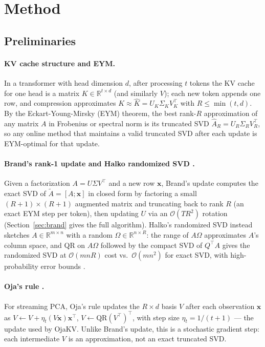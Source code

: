 \documentclass{article}
\newcommand{\R}{\mathbb{R}}
\begin{document}
\section{Method}
\label{sec:method}

\subsection{Preliminaries}
\label{sec:background}

\paragraph{KV cache structure and EYM.}
In a transformer with head dimension $d$, after processing $t$ tokens the KV
cache for one head is a matrix $K \in \R^{t \times d}$ (and similarly $V$);
each new token appends one row, and compression approximates
$K \approx \hat{K} = U_K \Sigma_K V_K^\top$ with $R \leq \min(t, d)$.  By the
Eckart-Young-Mirsky (EYM) theorem, the best rank-$R$ approximation of any
matrix $A$ in Frobenius or spectral norm is its truncated SVD
$\hat{A}_R = U_R \Sigma_R V_R^\top$, so any online method that maintains a
valid truncated SVD after each update is EYM-optimal for that update.

\paragraph{Brand's rank-1 update \citep{brand2006} and Halko randomized SVD \citep{halko2011}.}
Given a factorization $A = U \Sigma V^\top$ and a new row $\mathbf{x}$,
Brand's update computes the exact SVD of $\tilde{A} = [A; \mathbf{x}]$ in
closed form by factoring a small $(R+1) \times (R+1)$ augmented matrix and
truncating back to rank $R$ (an exact EYM step per token), then updating
$U$ via an $\mathcal{O}(TR^2)$ rotation (Section~\ref{sec:brand} gives the
full algorithm).  Halko's randomized SVD instead sketches $A \in
\R^{m \times n}$ with a random $\Omega \in \R^{n \times R}$: the range of
$A\Omega$ approximates $A$'s column space, and QR on $A\Omega$ followed by
the compact SVD of $Q^\top A$ gives the randomized SVD at
$\mathcal{O}(mnR)$ cost vs.\ $\mathcal{O}(mn^2)$ for exact SVD, with
high-probability error bounds \citep{halko2011}.

\paragraph{Oja's rule \citep{oja1982}.}
For streaming PCA, Oja's rule updates the $R \times d$ basis $V$ after each
observation $\mathbf{x}$ as $V \leftarrow V + \eta_t (V\mathbf{x})\mathbf{x}^\top$,
$V \leftarrow \mathrm{QR}(V^\top)^\top$, with step size $\eta_t = 1/(t+1)$
--- the update used by OjaKV.  Unlike Brand's update, this is a stochastic
gradient step: each intermediate $V$ is an approximation, not an exact
truncated SVD.
\end{document}
